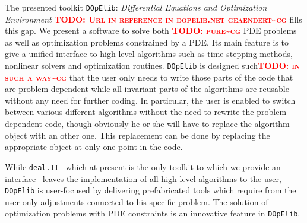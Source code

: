 \documentclass[prodmode,acmtoms]{acmsmall}
\numberwithin{equation}{section}
\newcommand{\deal}{\texttt{deal.II}}
\newcommand{\dope}{\texttt{DOpElib}}
\newcommand{\todocg}[1]{\textbf{\textsc{\textcolor{red}{TODO: #1\textasciitilde cg}}}}
\begin{document}
The presented toolkit \dope{}: 
\textit{Differential Equations and Optimization Environment} \cite{dope} \todocg{Url in reference in dopelib.net geaendert}
fills this gap. We present a software
to solve both \todocg{pure} PDE problems as well as optimization problems 
constrained by a PDE. 
Its main feature is to give a unified interface to high level algorithms such as 
time-stepping methods, nonlinear solvers and optimization routines. 
\dope{} is designed such\todocg{in such a way} that the user only needs to write those parts
of the code that are problem dependent while all invariant 
parts of the algorithms
are reusable without any need for further coding.
In particular, the user is enabled to switch between various different 
algorithms without the need to rewrite the problem dependent code, 
though obviously he or she will
have to replace the algorithm object with an other one. 
This replacement can be done by replacing the appropriate object at only
one point in the code.

While \deal{} --which at present is the only toolkit to which we provide an 
interface-- leaves the implementation of all high-level algorithms to the user, 
\dope{} is user-focused by delivering
prefabricated tools which require from the user only adjustments connected
to his specific problem. The solution of optimization problems with PDE
constraints is an innovative feature in \dope{}.
\end{document}
